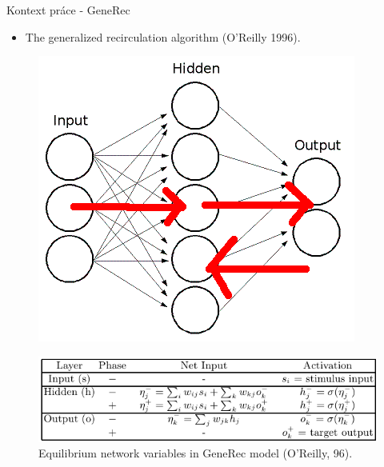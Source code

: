\documentclass[xcolor=dvipsnames]{beamer}
\begin{document}
\begin{frame}{Kontext práce - GeneRec}
  \begin{itemize} 
    \item The generalized recirculation algorithm (O'Reilly 1996).
  \end{itemize} 
  
  \begin{figure}
    \centering
    \includegraphics[scale=0.4]{img/3_layer_network_generec.png}
  \end{figure} 
  \begin{figure}  
    \centering
    \vspace{-10pt} 
    \includegraphics[scale=0.4]{img/generec_activations.png}
    \caption{{\tiny Equilibrium network variables in GeneRec model (O'Reilly, 96).}} 
  \end{figure} 
\end{frame}
\end{document}
